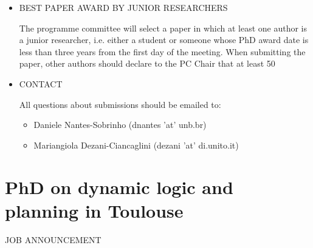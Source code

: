 \documentclass[prodmode,acmtecs]{acmsmall} %
\begin{document}
\begin{itemize}
\begin{itemize}\item  Regular research papers are limited to 15 pages, excluding references and appendices. They must present original research which is unpublished and not submitted elsewhere.
\item  System descriptions are limited to 15 pages, excluding references. Shorter papers are welcome and will be given equal consideration. A system description must present new software tools, or significantly new versions of such tools, in which FSCD topics play an important role. An archive of the code with instructions on how to install and run the tool must be submitted. In addition, a webpage where the system can be experimented with should be provided.
\end{itemize} 
  Submissions must be unpublished and not submitted for publication elsewhere. They will be judged on relevance, significance, originality, correctness, and readability. Reviewers may consider material provided in appendices, but submissions must be self-contained within the page limit. If software or data is relevant to a paper, a link that provides access to the software/data must be provided to enable reproduction of results. 
 
  One author of each accepted paper is expected to register and present the work in person at the conference. In case this is not possible, online presentation will be arranged, but in-person registration will still be required. 
 
\item  BEST PAPER AWARD BY JUNIOR RESEARCHERS 
 
  The programme committee will select a paper in which at least one author is a junior researcher, i.e. either a student or someone whose PhD award date is less than three years from the first day of the meeting. When submitting the paper, other authors should declare to the PC Chair that at least 50%
 
\item  CONTACT 
 
  All questions about submissions should be emailed to: 
 
\begin{itemize}\item  Daniele Nantes-Sobrinho        (dnantes 'at' unb.br)
\item  Mariangiola Dezani-Ciancaglini (dezani 'at' di.unito.it)
\end{itemize} 
\end{itemize}\section{PhD on dynamic logic and planning in Toulouse}\label{PhDondynamiclogicandplanninginToulouse}JOB ANNOUNCEMENT 
\end{document}
